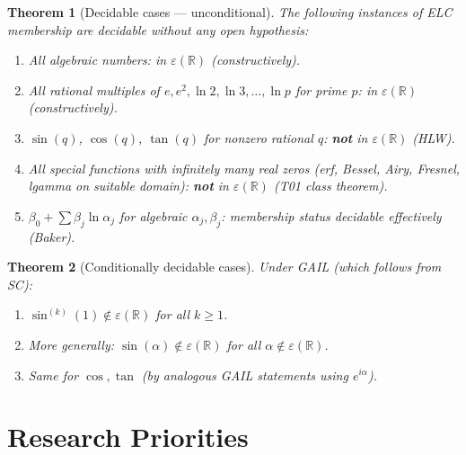 \documentclass[11pt]{article}
\newtheorem{theorem}{Theorem}
\begin{document}
\begin{theorem}[Decidable cases — unconditional]
The following instances of ELC membership are decidable without any open hypothesis:
\begin{enumerate}
  \item All algebraic numbers: in $\varepsilon(\mathbb{R})$ (constructively).
  \item All rational multiples of $e, e^2, \ln 2, \ln 3, \ldots, \ln p$ for prime $p$:
    in $\varepsilon(\mathbb{R})$ (constructively).
  \item $\sin(q)$, $\cos(q)$, $\tan(q)$ for nonzero rational $q$:
    \textbf{not} in $\varepsilon(\mathbb{R})$ (HLW).
  \item All special functions with infinitely many real zeros
    (erf, Bessel, Airy, Fresnel, lgamma on suitable domain):
    \textbf{not} in $\varepsilon(\mathbb{R})$ (T01 class theorem).
  \item $\beta_0 + \sum \beta_j \ln \alpha_j$ for algebraic $\alpha_j, \beta_j$:
    membership status decidable effectively (Baker).
\end{enumerate}
\end{theorem}

\begin{theorem}[Conditionally decidable cases]
Under GAIL (which follows from SC):
\begin{enumerate}
  \item $\sin^{(k)}(1) \notin \varepsilon(\mathbb{R})$ for all $k \geq 1$.
  \item More generally: $\sin(\alpha) \notin \varepsilon(\mathbb{R})$ for all $\alpha \notin \varepsilon(\mathbb{R})$.
  \item Same for $\cos, \tan$ (by analogous GAIL statements using $e^{i\alpha}$).
\end{enumerate}
\end{theorem}

\section{Research Priorities}
\end{document}
